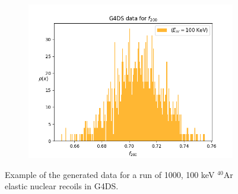 \documentclass[11pt]{article} %
\begin{document}
\begin{figure}[H]\ContinuedFloat
\centering
\begin{minipage}{.5\textwidth}
  \centering
  \begin{subfigure}{.9\textwidth}
      \includegraphics[width=\textwidth]{./images/f200like_100.png}
  \end{subfigure}
\end{minipage}
\caption{Example of the generated data for a run of 1000, 100 keV $^{40}\mathrm{\text{Ar}}$ elastic nuclear recoils in G4DS.}
\label{fig:example_vars}
\end{figure}
\end{document}
